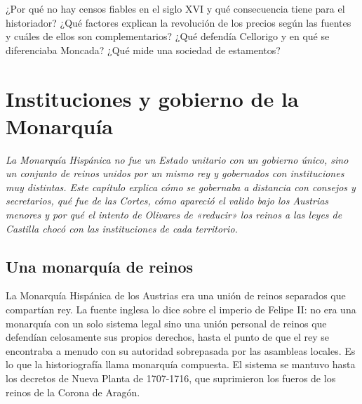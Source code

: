 \documentclass{book}
\begin{document}
\begin{tcolorbox}[title={Autoficha}, studiumcheck, breakable]

¿Por qué no hay censos fiables en el siglo XVI y qué consecuencia tiene para el historiador? ¿Qué factores explican la revolución de los precios según las fuentes y cuáles de ellos son complementarios? ¿Qué defendía Cellorigo y en qué se diferenciaba Moncada? ¿Qué mide una sociedad de estamentos?

\end{tcolorbox}

\chapter{Instituciones y gobierno de la Monarquía}
\label{chap:hist-09}

\noindent\textit{La Monarquía Hispánica no fue un Estado unitario con un gobierno único, sino un conjunto de reinos unidos por un mismo rey y gobernados con instituciones muy distintas. Este capítulo explica cómo se gobernaba a distancia con consejos y secretarios, qué fue de las Cortes, cómo apareció el valido bajo los Austrias menores y por qué el intento de Olivares de «reducir» los reinos a las leyes de Castilla chocó con las instituciones de cada territorio.}


\section{Una monarquía de reinos}

La Monarquía Hispánica de los Austrias era una unión de reinos separados que compartían rey. La fuente inglesa lo dice sobre el imperio de Felipe II: no era una monarquía con un solo sistema legal sino una unión personal de reinos que defendían celosamente sus propios derechos, hasta el punto de que el rey se encontraba a menudo con su autoridad sobrepasada por las asambleas locales. Es lo que la historiografía llama monarquía compuesta. El sistema se mantuvo hasta los decretos de Nueva Planta de 1707-1716, que suprimieron los fueros de los reinos de la Corona de Aragón.
\end{document}
